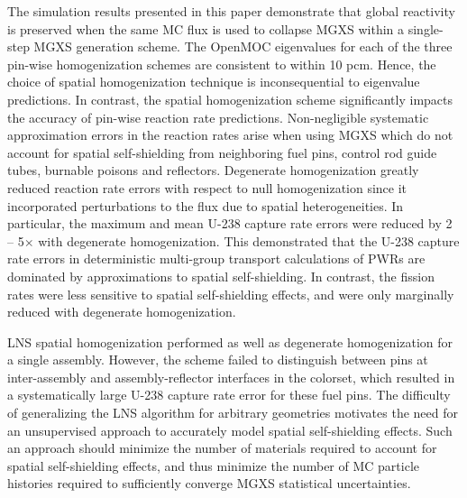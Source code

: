 The simulation results presented in this paper demonstrate that global reactivity is preserved when the same MC flux is used to collapse MGXS within a single-step MGXS generation scheme. The OpenMOC eigenvalues for each of the three pin-wise homogenization schemes are consistent to within 10 pcm. Hence, the choice of spatial homogenization technique is inconsequential to eigenvalue predictions. In contrast, the spatial homogenization scheme significantly impacts the accuracy of pin-wise reaction rate predictions. Non-negligible systematic approximation errors in the reaction rates arise when using MGXS which do not account for spatial self-shielding from neighboring fuel pins, control rod guide tubes, burnable poisons and reflectors. Degenerate homogenization greatly reduced reaction rate errors with respect to null homogenization since it incorporated perturbations to the flux due to spatial heterogeneities. In particular, the maximum and mean U-238 capture rate errors were reduced by 2 -- 5$\times$ with degenerate homogenization. This demonstrated that the U-238 capture rate errors in deterministic multi-group transport calculations of PWRs are dominated by approximations to spatial self-shielding. In contrast, the fission rates were less sensitive to spatial self-shielding effects, and were only marginally reduced with degenerate homogenization.

LNS spatial homogenization performed as well as degenerate homogenization for a single assembly. However, the scheme failed to distinguish between pins at inter-assembly and assembly-reflector interfaces in the colorset, which resulted in a systematically large U-238 capture rate error for these fuel pins. The difficulty of generalizing the LNS algorithm for arbitrary geometries motivates the need for an unsupervised approach to accurately model spatial self-shielding effects. Such an approach should minimize the number of materials required to account for spatial self-shielding effects, and thus minimize the number of MC particle histories required to sufficiently converge MGXS statistical uncertainties.


